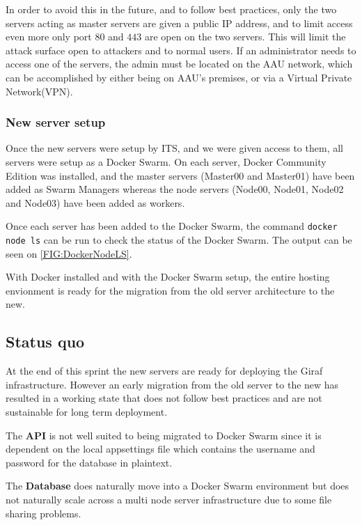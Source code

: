 In order to avoid this in the future, and to follow best practices, only the two servers acting as master servers are given a public IP address, and to limit access even more only port $80$ and $443$ are open on the two servers.
This will limit the attack surface open to attackers and to normal users.
If an administrator needs to access one of the servers, the admin must be located on the AAU network, which can be accomplished by either being on AAU's premises, or via a Virtual Private Network(VPN).

\subsubsection{New server setup}

Once the new servers were setup by ITS, and we were given access to them, all servers were setup as a Docker Swarm.
On each server, Docker Community Edition was installed, and the master servers (Master00 and Master01) have been added as Swarm Managers whereas the node servers (Node00, Node01, Node02 and Node03) have been added as workers.

Once each server has been added to the Docker Swarm, the command \lstinline[columns=fixed]{docker node ls} can be run to check the status of the Docker Swarm.
The output can be seen on \autoref{FIG:DockerNodeLS}.

With Docker installed and with the Docker Swarm setup, the entire hosting envionment is ready for the migration from the old server architecture to the new.

\subsection{Status quo}
At the end of this sprint the new servers are ready for deploying the Giraf infrastructure.
However an early migration from the old server to the new has resulted in a working state that does not follow best practices and are not sustainable for long term deployment.

The \textbf{API} is not well suited to being migrated to Docker Swarm since it is dependent on the local appsettings file which contains the username and password for the database in plaintext.

The \textbf{Database} does naturally move into a Docker Swarm environment but does not naturally scale across a multi node server infrastructure due to some file sharing problems.


